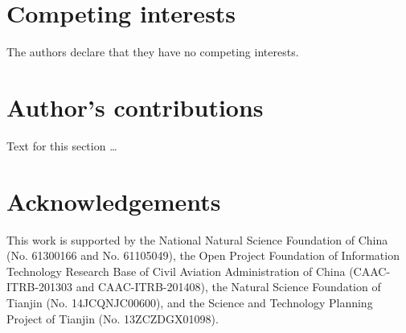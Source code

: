 \documentclass{bmcart}
\begin{document}
\begin{backmatter}

\section*{Competing interests}
  The authors declare that they have no competing interests.

\section*{Author's contributions}
    Text for this section \ldots

\section*{Acknowledgements}
This work is supported by the National Natural Science Foundation of China (No. 61300166 and No. 61105049), the Open Project Foundation of Information Technology Research Base of Civil Aviation Administration of China (CAAC-ITRB-201303 and CAAC-ITRB-201408), the Natural Science Foundation of Tianjin (No. 14JCQNJC00600), and the Science and Technology Planning Project of Tianjin (No. 13ZCZDGX01098).




\end{backmatter}
\end{document}
